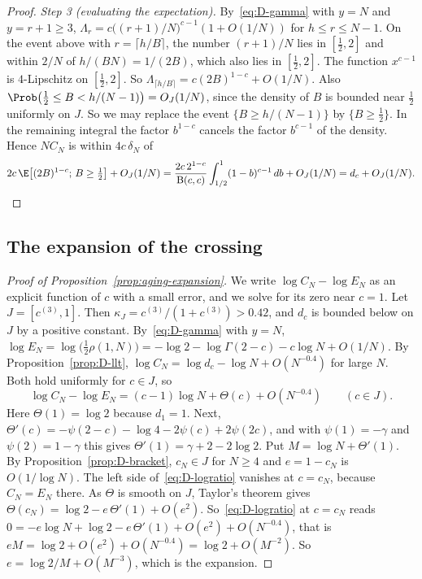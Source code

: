 \begin{proof}
\emph{Step 3 (evaluating the expectation).} By~\eqref{eq:D-gamma} with $y=N$
and $y=r+1\ge3$,
$\Lambda_r=c\bigl((r+1)/N\bigr)^{c-1}(1+O(1/N))$ for $h\le r\le N-1$. On the
event above with $r=\lceil h/B\rceil$, the number $(r+1)/N$ lies in
$[\frac12,2]$ and within $2/N$ of $h/(BN)=1/(2B)$, which also lies in
$[\frac12,2]$. The function $x^{c-1}$ is $4$-Lipschitz on $[\frac12,2]$. So
$\Lambda_{\lceil h/B\rceil}=c(2B)^{1-c}+O(1/N)$. Also
$\Prob\bigl(\frac12\le B<h/(N-1)\bigr)=O_J(1/N)$, since the density of $B$ is
bounded near $\frac12$ uniformly on $J$. So we may replace the event
$\{B\ge h/(N-1)\}$ by $\{B\ge\frac12\}$. In the remaining integral the factor
$b^{1-c}$ cancels the factor $b^{c-1}$ of the density. Hence $NC_N$ is within
$4c\,\delta_N$ of
\[
2c\,\E\bigl[(2B)^{1-c};\,B\ge\tfrac12\bigr]+O_J(1/N)
=\frac{2c\,2^{1-c}}{\mathrm B(c,c)}\int_{1/2}^1(1-b)^{c-1}\,db+O_J(1/N)=d_c+O_J(1/N).\qedhere
\]
\end{proof}

\subsection{The expansion of the crossing}

\begin{proof}[Proof of Proposition~\ref{prop:aging-expansion}]
We write $\log C_N-\log E_N$ as an explicit function of $c$ with a small
error, and we solve for its zero near $c=1$. Let $J=[c^{(3)},1]$. Then $\kappa_J=c^{(3)}/(1+c^{(3)})>0.42$, and $d_c$ is
bounded below on $J$ by a positive constant. By~\eqref{eq:D-gamma} with
$y=N$,
$\log E_N=\log\bigl(\tfrac12\rho(1,N)\bigr)=-\log2-\log\Gamma(2-c)-c\log N+O(1/N)$.
By Proposition~\ref{prop:D-llt},
$\log C_N=\log d_c-\log N+O(N^{-0.4})$ for large $N$. Both hold uniformly for
$c\in J$, so
\begin{equation}\label{eq:D-logratio}
\log C_N-\log E_N=(c-1)\log N+\Theta(c)+O(N^{-0.4})\qquad(c\in J).
\end{equation}
Here $\Theta(1)=\log2$ because $d_1=1$. Next,
$\Theta'(c)=-\psi(2-c)-\log4-2\psi(c)+2\psi(2c)$, and with $\psi(1)=-\gamma$
and $\psi(2)=1-\gamma$ this gives $\Theta'(1)=\gamma+2-2\log2$. Put
$M=\log N+\Theta'(1)$. By Proposition~\ref{prop:D-bracket}, $c_N\in J$ for
$N\ge4$ and $e=1-c_N$ is $O(1/\log N)$. The left side
of~\eqref{eq:D-logratio} vanishes at $c=c_N$, because $C_N=E_N$ there. As
$\Theta$ is smooth on $J$, Taylor's theorem gives
$\Theta(c_N)=\log2-e\,\Theta'(1)+O(e^2)$. So~\eqref{eq:D-logratio} at $c=c_N$
reads $0=-e\log N+\log2-e\,\Theta'(1)+O(e^2)+O(N^{-0.4})$, that is
$eM=\log2+O(e^2)+O(N^{-0.4})=\log2+O(M^{-2})$. So
$e=\log2/M+O(M^{-3})$, which is the expansion.
\end{proof}

